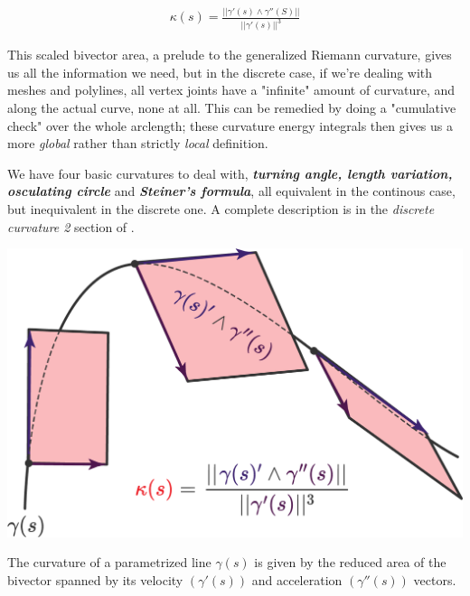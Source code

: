 \begin{example}
\begin{align*}
\kappa(s) = \frac{|| \gamma'(s) \wedge \gamma''(S) ||}{|| \gamma'(s) ||^3}
\end{align*}    
\end{example}


This scaled bivector area, a prelude to the generalized Riemann curvature,
gives us all the information we need, but in the discrete case, if
we're dealing with meshes and polylines, all vertex joints have
a "infinite" amount of curvature, and along the actual curve, none at all.
This can be remedied by doing a "cumulative check" over the whole arclength;
these curvature energy integrals then gives us a more \textit{global}
rather than strictly \textit{local} definition.





We have four basic curvatures to deal with, \textit{\textbf{turning angle,
length variation, osculating circle}} and \textit{\textbf{Steiner's formula}},
all equivalent in the continous case, but inequivalent in the discrete one.
A complete description is in the \textit{discrete curvature 2} section of
\cite{discreteexterior1}.

\begin{marginfigure}
    \centering
    \includegraphics[width=1.0\linewidth]{images/curvature1.png}
    \caption{The curvature of a parametrized line $\gamma(s)$ is
    given by the reduced area of the bivector spanned by its velocity
    $(\gamma'(s))$ and acceleration $(\gamma''(s))$ vectors.}
\end{marginfigure}

